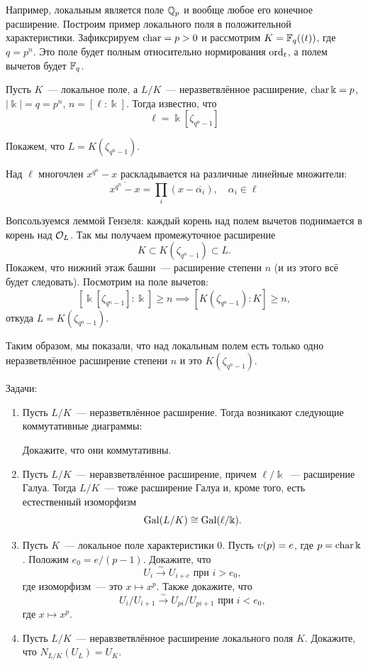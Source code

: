 	 \begin{example}
	 	Например, локальным является поле $\mathbb{Q}_{p}$ и вообще любое его конечное расширение. Построим пример локального поля в положительной характеристики. Зафиксрируем $\operatorname{char} = p > 0$ и рассмотрим $K = \mathbb{F}_{q}((t))$, где $q = p^n$. Это поле будет полным относительно нормирования $\operatorname{ord}_{t}$, а полем вычетов будет $\mathbb{F}_{q}$.
	 \end{example}

	 Пусть $K$~--- локальное поле, а $L/K$~--- неразветвлённое расширение, $\operatorname{char}{\Bbbk} = p$, $|\Bbbk| = q = p^n$, $n = [\ell : \Bbbk]$. Тогда известно, что 
	 \[
	 	\ell = \Bbbk[\zeta_{q^n - 1}]
	 \]

	 Покажем, что $L = K(\zeta_{q^n - 1})$. 

	 Над $\ell$ многочлен $x^{q^n} - x$ раскладывается на различные линейные множители:
	 \[
	 	\overline{x^{q^n} - x} = \prod_{i}(x - \overline{\alpha_i}), \quad \alpha_i \in \ell 
	 \]

	 Вопсользуемся леммой Гензеля: каждый корень над полем вычетов поднимается в корень над $\mathcal{O}_{L}$. Так мы получаем промежуточное расширение 
	 \[
	 	K \subset K(\zeta_{q^n - 1}) \subset L.
	 \]
	 Покажем, что нижний этаж башни~--- расширение степени $n$ (и из этого всё будет следовать). Посмотрим на поле вычетов:
	 \[
	 	[\Bbbk[\zeta_{q^n - 1}] : \Bbbk] \ge n \implies [ K(\zeta_{q^n - 1}) : K ] \ge n,
	 \]
	 откуда $L = K(\zeta_{q^n - 1})$. 

	 Таким образом, мы показали, что над локальным полем есть только одно неразветвлённое расширение степени $n$ и это $K(\zeta_{q^n - 1})$.

	 \begin{homework}
	 	Задачи: 
	 	\begin{enumerate}
	 		\item Пусть $L/K$~--- неразветвлённое расширение. Тогда возникают следующие коммутативные диаграммы: 


	 		Докажите, что они коммутативны. 

	 		\item Пусть $L/K$~--- неравзветвлённое расширение, причем $\ell/\Bbbk$~--- расширение Галуа. Тогда $L/K$~--- тоже расширение Галуа и, кроме того, есть естественный изоморфизм 
	 		\[
	 			\operatorname{Gal}(L/K) \cong \operatorname{Gal}(\ell/\Bbbk).
	 		\]


	 		\item Пусть $K$~--- локальное поле характеристики $0$. Пусть $\upsilon(p) = e$, где $p = \operatorname{char}{\Bbbk}$. Положим $e_0 = e / (p - 1)$. Докажите, что 
	 		\[
	 			U_i \xrightarrow{\sim} U_{i + e} \text{ при } i > e_0,
	 		\]
	 		где изоморфизм~--- это $x \mapsto x^p$. Также докажите, что 
	 		\[
	 			U_i/U_{i + 1 } \xrightarrow{\sim} U_{p i}/U_{pi + 1} \text{ при } i < e_0,
	 		\]
	 		где $x \mapsto x^p$.

	 		\item Пусть $L/K$~--- неравзветвлённое расширение локального поля $K$. Докажите, что $N_{L/K}(U_L) = U_K$.
	 	\end{enumerate}
	 \end{homework}

